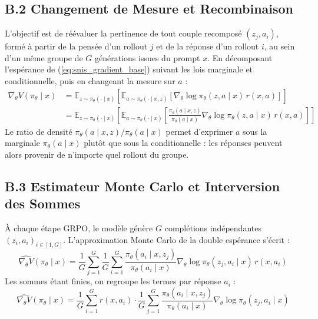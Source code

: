 \documentclass[11pt,a4paper]{article}
\begin{document}
\subsection*{B.2 Changement de Mesure et Recombinaison}
L'objectif est de réévaluer la pertinence de tout couple recomposé $(z_j, a_i)$, formé à partir de la pensée d'un rollout $j$ et de la réponse d'un rollout $i$, au sein d'un même groupe de $G$ générations issues du prompt $x$. En décomposant l'espérance de (\ref{eq:snis_gradient_base}) suivant les lois marginale et conditionnelle, puis en changeant la mesure sur $a$ :
\begin{align}
\nabla_\theta V(\pi_\theta \mid x) &= \mathbb{E}_{z \sim \pi_\theta(\cdot \mid x)} \left[ \mathbb{E}_{a \sim \pi_\theta(\cdot \mid x, z)} \left[ \nabla_\theta \log \pi_\theta(z,a \mid x) \, r(x,a) \right] \right] \\
&= \mathbb{E}_{z \sim \pi_\theta(\cdot \mid x)} \left[ \mathbb{E}_{a \sim \pi_\theta(\cdot \mid x)} \left[ \frac{\pi_\theta(a \mid x, z)}{\pi_\theta(a \mid x)} \nabla_\theta \log \pi_\theta(z,a \mid x) \, r(x,a) \right] \right]
\end{align}
Le ratio de densité $\pi_\theta(a \mid x, z) / \pi_\theta(a \mid x)$ permet d'exprimer $a$ sous la marginale $\pi_\theta(a \mid x)$ plutôt que sous la conditionnelle : les réponses peuvent alors provenir de n'importe quel rollout du groupe.

\subsection*{B.3 Estimateur Monte Carlo et Interversion des Sommes}
À chaque étape GRPO, le modèle génère $G$ complétions indépendantes $(z_i, a_i)_{i \in [1, G]}$. L'approximation Monte Carlo de la double espérance s'écrit :
\begin{equation}
\widehat{\nabla_\theta V}(\pi_\theta \mid x) = \frac{1}{G} \sum_{j=1}^G \frac{1}{G} \sum_{i=1}^G \frac{\pi_\theta(a_i \mid x, z_j)}{\pi_\theta(a_i \mid x)} \nabla_\theta \log \pi_\theta(z_j, a_i \mid x) \, r(x, a_i)
\end{equation}
Les sommes étant finies, on regroupe les termes par réponse $a_i$ :
\begin{equation}
\widehat{\nabla_\theta V}(\pi_\theta \mid x) = \frac{1}{G} \sum_{i=1}^G r(x, a_i) \cdot \frac{1}{G} \sum_{j=1}^G \frac{\pi_\theta(a_i \mid x, z_j)}{\pi_\theta(a_i \mid x)} \nabla_\theta \log \pi_\theta(z_j, a_i \mid x)
\end{equation}
\end{document}
